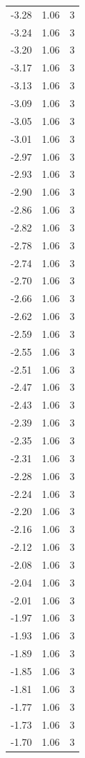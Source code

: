 \begin{longtable}{lrr}
  -3.28 & 1.06 & 3 \\
  -3.24 & 1.06 & 3 \\
  -3.20 & 1.06 & 3 \\
  -3.17 & 1.06 & 3 \\
  -3.13 & 1.06 & 3 \\
  -3.09 & 1.06 & 3 \\
  -3.05 & 1.06 & 3 \\
  -3.01 & 1.06 & 3 \\
  -2.97 & 1.06 & 3 \\
  -2.93 & 1.06 & 3 \\
  -2.90 & 1.06 & 3 \\
  -2.86 & 1.06 & 3 \\
  -2.82 & 1.06 & 3 \\
  -2.78 & 1.06 & 3 \\
  -2.74 & 1.06 & 3 \\
  -2.70 & 1.06 & 3 \\
  -2.66 & 1.06 & 3 \\
  -2.62 & 1.06 & 3 \\
  -2.59 & 1.06 & 3 \\
  -2.55 & 1.06 & 3 \\
  -2.51 & 1.06 & 3 \\
  -2.47 & 1.06 & 3 \\
  -2.43 & 1.06 & 3 \\
  -2.39 & 1.06 & 3 \\
  -2.35 & 1.06 & 3 \\
  -2.31 & 1.06 & 3 \\
  -2.28 & 1.06 & 3 \\
  -2.24 & 1.06 & 3 \\
  -2.20 & 1.06 & 3 \\
  -2.16 & 1.06 & 3 \\
  -2.12 & 1.06 & 3 \\
  -2.08 & 1.06 & 3 \\
  -2.04 & 1.06 & 3 \\
  -2.01 & 1.06 & 3 \\
  -1.97 & 1.06 & 3 \\
  -1.93 & 1.06 & 3 \\
  -1.89 & 1.06 & 3 \\
  -1.85 & 1.06 & 3 \\
  -1.81 & 1.06 & 3 \\
  -1.77 & 1.06 & 3 \\
  -1.73 & 1.06 & 3 \\
  -1.70 & 1.06 & 3 \\

\end{longtable}
